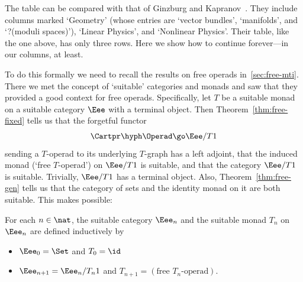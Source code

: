 The table can be compared with that of Ginzburg%
%
%
and
Kapranov~\cite[p.~204]{GiKa}.%
%
%
 They include columns marked `Geometry'
(whose entries are `vector bundles', `manifolds', and `?(moduli spaces)'),
`Linear Physics', and `Nonlinear Physics'.  Their table, like the one
above, has only three rows.  Here we show how to continue forever---in our
columns, at least.

To do this formally we need to recall the results on free operads
in~\ref{sec:free-mti}.  There we met the concept of `suitable' categories
and monads and saw that they provided a good context for free operads.
Specifically, let $T$ be a suitable monad on a suitable category $\Eee$
with a terminal object.  Then Theorem~\ref{thm:free-fixed} tells us that
the forgetful functor
\[
\Cartpr\hyph\Operad \go \Eee/T1
\]
sending a $T$-operad to its underlying $T$-graph has a left adjoint, that
the induced monad (`free $T$-operad') on $\Eee/T1$ is suitable, and that
the category $\Eee/T1$ is suitable.  Trivially, $\Eee/T1$ has a terminal
object.  Also, Theorem~\ref{thm:free-gen} tells us that the category of
sets and the identity monad on it are both suitable.  This makes possible:
%
\begin{defn}	
For each $n\in\nat$, the suitable category $\Eee_n$%
% 
% 
and the suitable
monad $T_n$%
% 
%
%
% 
on $\Eee_n$ are defined inductively by
%
\begin{itemize}
\item $\Eee_0 = \Set$ and $T_0 = \id$
\item $\Eee_{n+1} = \Eee_n / T_n 1$ and
$T_{n+1} = (\textrm{free } T_n \textrm{-operad}).$ 
\end{itemize}
\end{defn}

